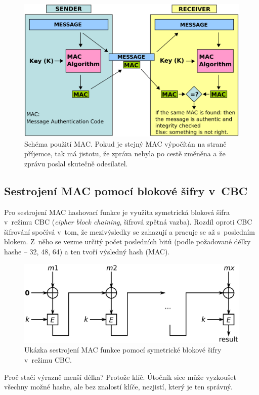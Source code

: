 \begin{figure}[H]
    \centering
    \includegraphics[width=1\linewidth]{mac.png}
    \caption{Schéma použití MAC. Pokud je stejný MAC výpočítán na straně příjemce, tak má jistotu, že zpráva nebyla po cestě změněna a že zprávu poslal skutečně odesílatel.}
\end{figure}

\subsection*{Sestrojení MAC pomocí blokové šifry v~CBC}

Pro sestrojení MAC hashovací funkce je využita symetrická bloková šifra v~režimu CBC (\textit{cipher block chaining}, šifrová zpětná vazba). Rozdíl oproti CBC šifrování spočívá v~tom, že mezivýsledky se zahazují a pracuje se až s~posledním blokem. Z~něho se vezme určitý počet posledních bitů (podle požadované délky hashe -- 32, 48, 64) a ten tvoří výsledný hash (MAC).

\begin{figure}[H]
    \centering
    \includegraphics[width=0.8\linewidth]{mac_cbc.png}
    \caption{Ukázka sestrojení MAC funkce pomocí symetrické blokové šifry v~režimu CBC.}
\end{figure}

Proč stačí výrazně menší délka? Protože klíč. Útočník sice může vyzkoušet všechny možné hashe, ale bez znalostí klíče, nezjistí, který je ten správný.

